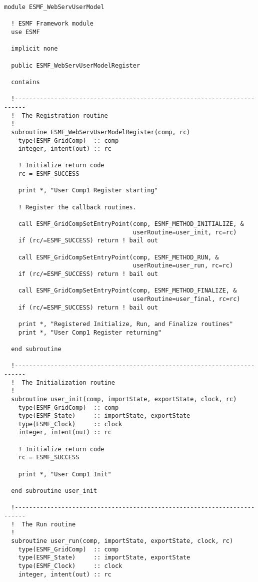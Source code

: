  \begin{verbatim}
module ESMF_WebServUserModel

  ! ESMF Framework module
  use ESMF

  implicit none

  public ESMF_WebServUserModelRegister

  contains

  !-------------------------------------------------------------------------
  !  The Registration routine
  !  
  subroutine ESMF_WebServUserModelRegister(comp, rc)
    type(ESMF_GridComp)  :: comp
    integer, intent(out) :: rc

    ! Initialize return code
    rc = ESMF_SUCCESS

    print *, "User Comp1 Register starting"

    ! Register the callback routines.

    call ESMF_GridCompSetEntryPoint(comp, ESMF_METHOD_INITIALIZE, &
                                    userRoutine=user_init, rc=rc)
    if (rc/=ESMF_SUCCESS) return ! bail out

    call ESMF_GridCompSetEntryPoint(comp, ESMF_METHOD_RUN, &
                                    userRoutine=user_run, rc=rc)
    if (rc/=ESMF_SUCCESS) return ! bail out

    call ESMF_GridCompSetEntryPoint(comp, ESMF_METHOD_FINALIZE, &
                                    userRoutine=user_final, rc=rc)
    if (rc/=ESMF_SUCCESS) return ! bail out

    print *, "Registered Initialize, Run, and Finalize routines"
    print *, "User Comp1 Register returning"

  end subroutine

  !-------------------------------------------------------------------------
  !  The Initialization routine
  !  
  subroutine user_init(comp, importState, exportState, clock, rc)
    type(ESMF_GridComp)  :: comp
    type(ESMF_State)     :: importState, exportState
    type(ESMF_Clock)     :: clock
    integer, intent(out) :: rc

    ! Initialize return code
    rc = ESMF_SUCCESS

    print *, "User Comp1 Init"

  end subroutine user_init

  !-------------------------------------------------------------------------
  !  The Run routine
  !  
  subroutine user_run(comp, importState, exportState, clock, rc)
    type(ESMF_GridComp)  :: comp
    type(ESMF_State)     :: importState, exportState
    type(ESMF_Clock)     :: clock
    integer, intent(out) :: rc


\end{verbatim}
